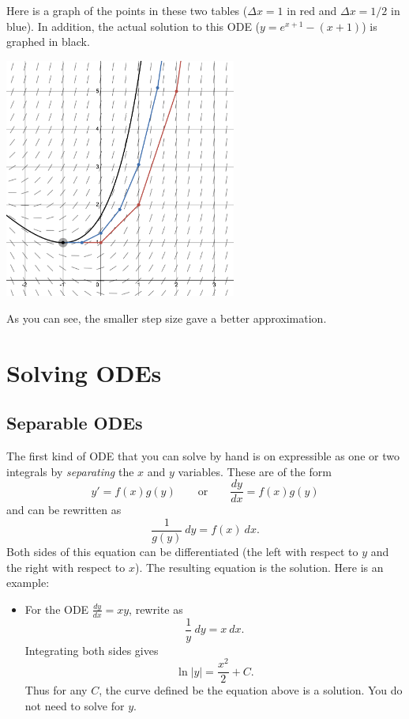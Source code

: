 \begin{itemize}[leftmargin=1em]
Here is a graph of the points in these two tables ($\Delta x = 1$ in red and $\Delta x = 1/2$ in blue). In addition, the actual solution to this ODE ($y=e^{x+1}-(x+1)$) is graphed in black.
\begin{center}
\includegraphics[width=3in]{img/eulers_method.png}
\end{center}
As you can see, the smaller step size gave a better approximation.
\end{itemize}


\section{Solving ODEs}
\subsection{Separable ODEs}
The first kind of ODE that you can solve by hand is on expressible as one or two integrals by \textit{separating} the $x$ and $y$ variables. These are of the form
$$y'=f(x)g(y) \quad\quad\text{or}\quad\quad \frac{dy}{dx}=f(x)g(y)$$
and can be rewritten as
$$\frac{1}{g(y)}\ dy = f(x)\ dx.$$
Both sides of this equation can be differentiated (the left with respect to $y$ and the right with respect to $x$). The resulting equation is the solution. Here is an example:
\begin{itemize}
\item For the ODE $\frac{dy}{dx} = xy$, rewrite as
$$\frac{1}{y}\ dy = x\ dx.$$
Integrating both sides gives
$$\ln|y| = \frac{x^2}{2} + C.$$
Thus for any $C$, the curve defined be the equation above is a solution. You do not need to solve for $y$.
\end{itemize}

